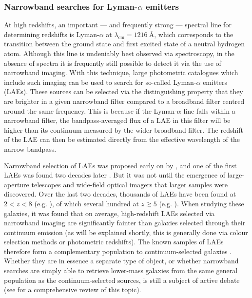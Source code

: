 \subsubsection{Narrowband searches for Lyman-\texorpdfstring{$\alpha$}{TEXT} emitters}\label{subsubsection:Lyman_alpha_emitters}
 At high redshifts, an important --- and frequently strong --- spectral line for determining redshifts is Lyman-$\alpha$ at $\lambda_{\mathrm{em}}=\SI{1216}{\angstrom}$, which corresponds to the transition between the ground state and first excited state of a neutral hydrogen atom. Although this line is undeniably best observed via spectroscopy, in the absence of spectra it is frequently still possible to detect it via the use of narrowband imaging. With this technique, large photometric catalogues which include such imaging can be used to search for so-called Lyman-$\alpha$ emitters (LAEs). These sources can be selected via the distinguishing property that they are brighter in a given narrowband filter compared to a broadband filter centred around the same frequency. This is because if the Lyman-$\alpha$ line falls within a narrowband filter, the bandpass-averaged flux of a LAE in this filter will be higher than its continuum measured by the wider broadband filter. The redshift of the LAE can then be estimated directly from the effective wavelength of the narrow bandpass. \par

Narrowband selection of LAEs was proposed early on by \cite{1967ApJ...147..868P}, and one of the first LAEs was found two decades later \citep{1985ApJ...299L...1D}. But it was not until the emergence of large-aperture telescopes and wide-field optical imagers that larger samples were discovered. Over the last two decades, thousands of LAEs have been found at $2<z<8$ (e.g. \citealt{1998AJ....115.1319C,2000ApJ...545L..85R,2008ApJS..176..301O,2010ApJ...721.1853T}), of which several hundred at $z\gtrsim5$ (e.g. \citealt{2001ApJ...563L...5R,2008ApJS..176..301O,2010ApJ...723..869O,2010A&A...515A..97H,2011ApJ...741..101H,2015MNRAS.451..400M}). When studying these galaxies, it was found that on average, high-redshift LAEs selected via narrowband imaging are significantly fainter than galaxies selected through their continuum emission (as will be explained shortly, this is generally done via colour selection methods or photometric redshifts). The known samples of LAEs therefore form a complementary population to continuum-selected galaxies \citep{2016PASA...33...37F}. Whether they are in essence a separate type of object, or whether narrowband searches are simply able to retrieve lower-mass galaxies from the same general population as the continuum-selected sources, is still a subject of active debate (see \citealt{2013ASSL..396..223D} for a comprehensive review of this topic). \par 

